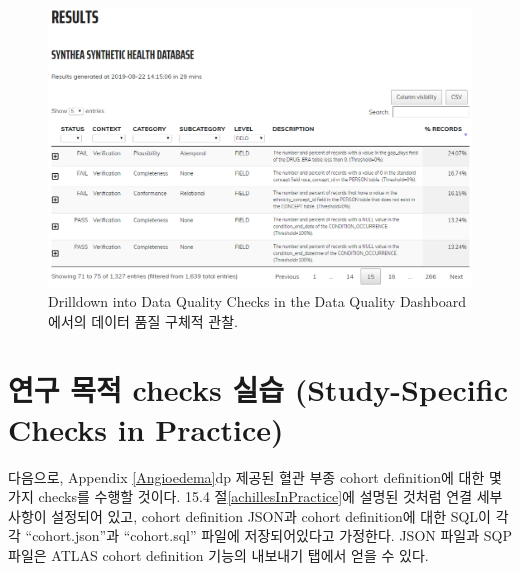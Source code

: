 \documentclass[11pt]{book}
\newenvironment{Shaded}{\begin{snugshade}}{\end{snugshade}}
\newcommand{\KeywordTok}[1]{\textcolor[rgb]{0.13,0.29,0.53}{\textbf{#1}}}
\newcommand{\DataTypeTok}[1]{\textcolor[rgb]{0.13,0.29,0.53}{#1}}
\newcommand{\StringTok}[1]{\textcolor[rgb]{0.31,0.60,0.02}{#1}}
\newcommand{\OperatorTok}[1]{\textcolor[rgb]{0.81,0.36,0.00}{\textbf{#1}}}
\newcommand{\NormalTok}[1]{#1}
\theoremstyle{definition}
\theoremstyle{definition}
\theoremstyle{definition}
\theoremstyle{remark}
\begin{document}
\begin{figure}

{\centering \includegraphics[width=1\linewidth]{images/DataQuality/dqdResults} 

}

\caption{Drilldown into Data Quality Checks in the Data Quality Dashboard 에서의 데이터 품질 구체적 관찰.}\label{fig:dqdResults}
\end{figure}

\section{연구 목적 checks 실습 (Study-Specific Checks in
Practice)}\label{--checks--study-specific-checks-in-practice}

다음으로, Appendix \ref{Angioedema}dp 제공된 혈관 부종 cohort
definition에 대한 몇 가지 checks를 수행할 것이다. 15.4
절\ref{achillesInPractice}에 설명된 것처럼 연결 세부사항이 설정되어
있고, cohort definition JSON과 cohort definition에 대한 SQL이 각각
``cohort.json''과 ``cohort.sql'' 파일에 저장되어있다고 가정한다. JSON
파일과 SQP 파일은 ATLAS cohort definition 기능의 내보내기 탭에서 얻을 수
있다.

\begin{Shaded}
\end{Shaded}
\end{document}
